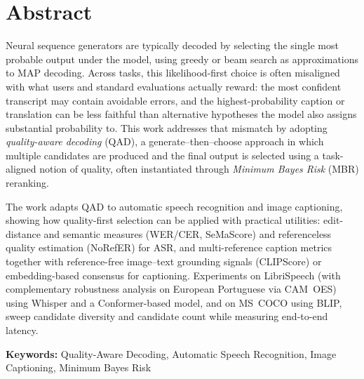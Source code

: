 
\section*{Abstract}


Neural sequence generators are typically decoded by selecting the single most probable output under the model, using greedy or beam search as approximations to MAP decoding. Across tasks, this likelihood-first choice is often misaligned with what users and standard evaluations actually reward: the most confident transcript may contain avoidable errors, and the highest-probability caption or translation can be less faithful than alternative hypotheses the model also assigns substantial probability to. This work addresses that mismatch by adopting \emph{quality-aware decoding} (QAD), a generate--then--choose approach in which multiple candidates are produced and the final output is selected using a task-aligned notion of quality, often instantiated through \emph{Minimum Bayes Risk} (MBR) reranking.

The work adapts QAD to automatic speech recognition and image captioning, showing how quality-first selection can be applied with practical utilities: edit-distance and semantic measures (WER/CER, SeMaScore) and referenceless quality estimation (NoRefER) for ASR, and multi-reference caption metrics together with reference-free image--text grounding signals (CLIPScore) or embedding-based consensus for captioning. Experiments on LibriSpeech (with complementary robustness analysis on European Portuguese via CAM~{O}ES) using Whisper and a Conformer-based model, and on MS~COCO using BLIP, sweep candidate diversity and candidate count while measuring end-to-end latency.
\vfill

\textbf{\Large Keywords:} Quality-Aware Decoding, Automatic Speech Recognition, Image Captioning, Minimum Bayes Risk


